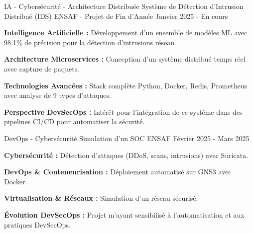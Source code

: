 
\begin{cventries}

    \cventry
    {IA - Cybersécurité - Architecture Distribuée}
    {Système de Détection d'Intrusion Distribué (IDS)} %
    {ENSAF - Projet de Fin d'Année} %
    {Janvier 2025 - En cours} %
    {
        \begin{cvitems} %
            \item {
                        \textbf{Intelligence Artificielle :}
                        Développement d'un ensemble de modèles ML avec 98.1\% de précision pour la détection d'intrusions réseau.}
            \item {
                        \textbf{Architecture Microservices :}
                        Conception d'un système distribué temps réel avec capture de paquets.}
            \item {
                        \textbf{Technologies Avancées :}
                        Stack complète Python, Docker, Redis, Prometheus avec analyse de 9 types d'attaques.}
            \item {
                        \textbf{Perspective DevSecOps :}
                        Intérêt pour l'intégration de ce système dans des pipelines CI/CD pour automatiser la sécurité.}
        \end{cvitems}
    }

    \cventry
    {DevOps - Cybersécurité}
    {Simulation d'un SOC} %
    {ENSAF} %
    {Février 2025 - Mars 2025} %
    {
        \begin{cvitems} %
            \item {
                        \textbf{Cybersécurité :}
                        Détection d'attaques (DDoS, scans, intrusions) avec Suricata.}
            \item {
                        \textbf{DevOps \& Conteneurisation :}
                        Déploiement automatisé sur GNS3 avec Docker.}
            \item {
                        \textbf{Virtualisation \& Réseaux :}
                        Simulation d'un réseau sécurisé.}
            \item {
                        \textbf{Évolution DevSecOps :}
                        Projet m'ayant sensibilisé à l'automatisation et aux pratiques DevSecOps.}
        \end{cvitems}
    }

\end{cventries}